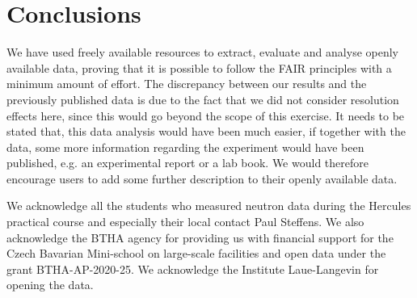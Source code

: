 \documentclass[aps,reprint,amsmath,amssymb,superscriptaddress]{revtex4-1}
\begin{document}
\section{Conclusions}

We have used freely available resources to extract, evaluate and analyse openly available data, proving that it is possible to follow the FAIR principles with a minimum amount of effort. 
The discrepancy between our results and the previously published data \cite{Aouissi} is due to the fact that we did not consider resolution effects here, since this would go beyond the scope of this exercise.
It needs to be stated that, this data analysis would have been much easier, if together with the data, some more information regarding the experiment would have been published, e.g. an experimental report or a lab book.
We would therefore encourage users to add some further description to their openly available data. 


\begin{acknowledgments}
We acknowledge all the students who measured neutron data \cite{data} during the Hercules practical course and especially their local contact Paul Steffens. 
We also acknowledge the BTHA agency for providing us with financial support for the Czech Bavarian Mini-school on large-scale facilities and open data under the grant BTHA-AP-2020-25. We acknowledge the Institute Laue-Langevin for opening the data.
\end{acknowledgments}




\end{document}
